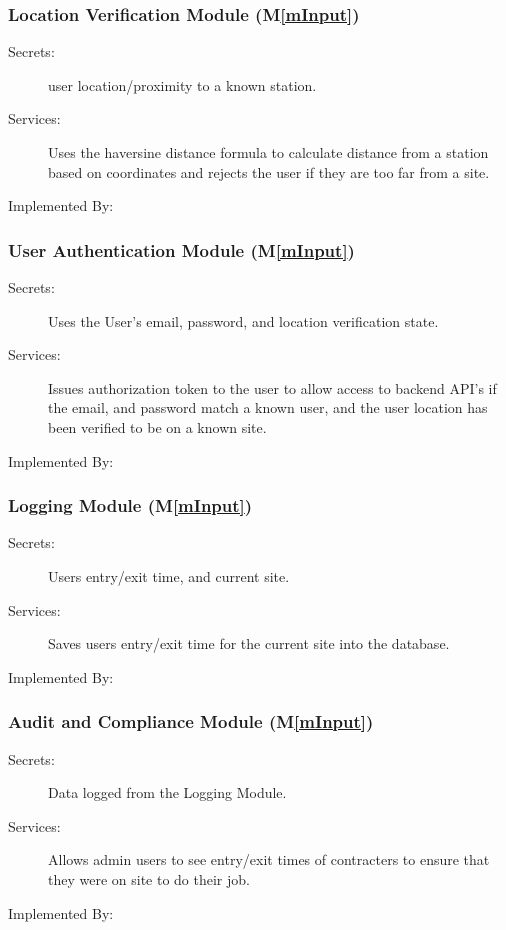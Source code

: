 \documentclass[12pt, titlepage]{article}
\newcommand{\mref}[1]{M\ref{#1}}
\begin{document}
\subsubsection{Location Verification Module (\mref{mInput})}
\begin{description}
  \item[Secrets:] user location/proximity to a known station.
  \item[Services:] Uses the haversine distance formula to calculate
    distance from a station based on coordinates and rejects the user
    if they are too far from a site.
  \item[Implemented By:] \progname
\end{description}

\subsubsection{User Authentication Module (\mref{mInput})}

\begin{description}
  \item[Secrets:] Uses the User's email, password, and location
    verification state.
  \item[Services:] Issues authorization token to the user to allow
    access to backend API's if the email, and password match a known
    user, and the user location has been verified to be on a known site.
  \item[Implemented By:] \progname
\end{description}

\subsubsection{Logging Module (\mref{mInput})}
\begin{description}
  \item[Secrets:] Users entry/exit time, and current site.
  \item[Services:] Saves users entry/exit time for the current site
    into the database.
  \item[Implemented By:] \progname
\end{description}

\subsubsection{Audit and Compliance Module (\mref{mInput})}

\begin{description}
  \item[Secrets:] Data logged from the Logging Module.
  \item[Services:] Allows admin users to see entry/exit times of
    contracters to ensure that they were on site to do their job.
  \item[Implemented By:] \progname
\end{description}
\end{document}
